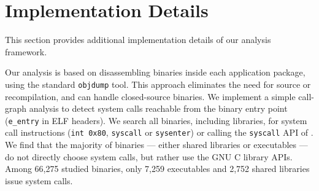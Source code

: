 \section{Implementation Details}
\label{sec:syspop:framework}

This section provides additional implementation details of our analysis framework. %


Our analysis is based on disassembling binaries inside each application package, using the standard {\tt objdump} tool.
This approach eliminates the need for source or recompilation, and can handle closed-source binaries.
We implement a simple call-graph analysis to detect system calls reachable from the binary entry point ({\tt e\_entry} in ELF headers). 
We search all binaries, including libraries, for system call instructions ({\tt int 0x80}, {\tt syscall} or {\tt sysenter}) or calling the {\tt syscall} API of \libc{}.
We find that the majority of binaries --- either shared libraries or executables --- do not directly choose system calls, but 
rather use the GNU C library APIs.
Among 66,275 studied binaries, only 7,259 executables and 2,752 shared libraries issue system calls.





